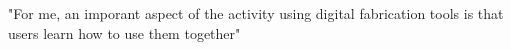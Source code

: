 "For me, an imporant aspect of the activity using digital fabrication tools is that users learn how to use them together"